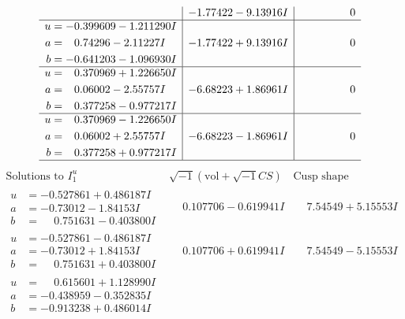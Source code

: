 \documentclass[1p]{elsarticle_modified}
\theoremstyle{definition}
\newcommand{\I}{\sqrt{-1}}
\begin{document}
$$\begin{array}{c|c|c}
 & -1.77422 - 9.13916 I & \phantom{-0.000000 } 0 \\ \hline\begin{aligned}
u &= -0.399609 - 1.211290 I \\
a &= \phantom{-}0.74296 - 2.11227 I \\
b &= -0.641203 - 1.096930 I\end{aligned}
 & -1.77422 + 9.13916 I & \phantom{-0.000000 } 0 \\ \hline\begin{aligned}
u &= \phantom{-}0.370969 + 1.226650 I \\
a &= \phantom{-}0.06002 - 2.55757 I \\
b &= \phantom{-}0.377258 - 0.977217 I\end{aligned}
 & -6.68223 + 1.86961 I & \phantom{-0.000000 } 0 \\ \hline\begin{aligned}
u &= \phantom{-}0.370969 - 1.226650 I \\
a &= \phantom{-}0.06002 + 2.55757 I \\
b &= \phantom{-}0.377258 + 0.977217 I\end{aligned}
 & -6.68223 - 1.86961 I & \phantom{-0.000000 } 0\\
 \hline 
 \end{array}$$\newpage$$\begin{array}{c|c|c}  
\text{Solutions to }I^u_{1}& \I (\text{vol} + \sqrt{-1}CS) & \text{Cusp shape}\\
 \hline 
\begin{aligned}
u &= -0.527861 + 0.486187 I \\
a &= -0.73012 - 1.84153 I \\
b &= \phantom{-}0.751631 - 0.403800 I\end{aligned}
 & \phantom{-}0.107706 - 0.619941 I & \phantom{-}7.54549 + 5.15553 I \\ \hline\begin{aligned}
u &= -0.527861 - 0.486187 I \\
a &= -0.73012 + 1.84153 I \\
b &= \phantom{-}0.751631 + 0.403800 I\end{aligned}
 & \phantom{-}0.107706 + 0.619941 I & \phantom{-}7.54549 - 5.15553 I \\ \hline\begin{aligned}
u &= \phantom{-}0.615601 + 1.128990 I \\
a &= -0.438959 - 0.352835 I \\
b &= -0.913238 + 0.486014 I\end{aligned}

\end{array}$$
\end{document}
